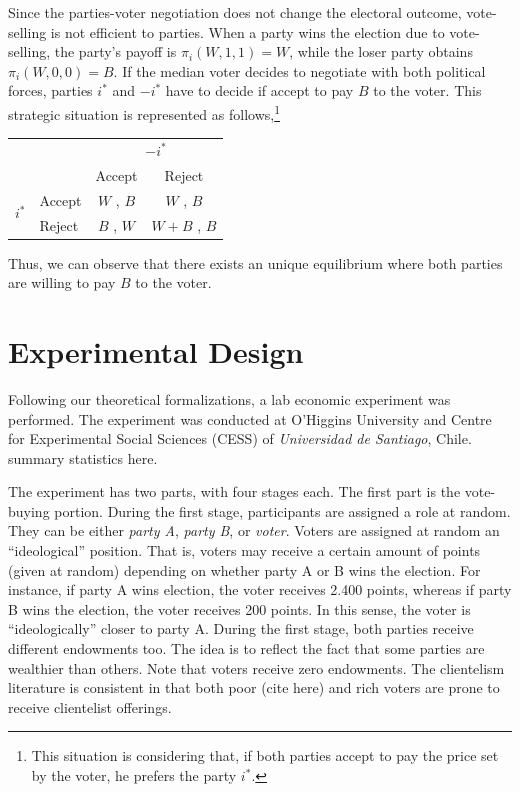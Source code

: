 \documentclass[onesided]{article}\usepackage[]{graphicx}\usepackage[]{color}
\begin{document}
Since the parties-voter negotiation does not change the electoral outcome, vote-selling is not efficient to parties. When a party wins the election due to vote-selling, the party's payoff is $\pi_i(W,1,1)=W$, while the loser party obtains $\pi_i(W,0,0)=B$. If the median voter decides to negotiate with both political forces, parties $i^*$ and $-i^*$ have to decide if accept to pay $B$ to the voter. This strategic situation is represented as follows,\footnote{This situation is considering that, if both parties accept to pay the price set by the voter, he prefers the party $i^*$.}


\begin{center}

\begin{tabular}{ll|c|c|}
     & \multicolumn{1}{c}{}& \multicolumn{2}{c}{\textbf{$-i^*$}}  \\
     &\multicolumn{1}{c}{} &\multicolumn{1}{c}{Accept} & \multicolumn{1}{c}{Reject} \\
     \cline{3-4}
    \multirow{ 2}{*}{$i^*$} & Accept & $W$ , $B$ & $W$ , $B$ \\
      \cline{3-4}
     & Reject & $B$ , $W$ & $W+B$ , $B$ \\
      \cline{3-4}
\end{tabular}
\end{center}

Thus, we can observe that there exists an unique equilibrium where both parties are willing to pay $B$ to the voter.


\section{Experimental Design}

Following our theoretical formalizations, a lab economic experiment was performed. The experiment was conducted at O'Higgins University and Centre for Experimental Social Sciences (CESS) of \emph{Universidad de Santiago}, Chile. {\color{red}summary statistics here}. 

The experiment has two parts, with four stages each. The first part is the vote-buying portion. During the first stage, participants are assigned a role at random. They can be either \emph{party A}, \emph{party B}, or \emph{voter}. Voters are assigned at random an ``ideological'' position. That is, voters may receive a certain amount of points (given at random) depending on whether party A or B wins the election. For instance, if party A wins election, the voter receives 2.400 points, whereas if party B wins the election, the voter receives 200 points. In this sense, the voter is ``ideologically'' closer to party A. During the first stage, both parties receive different endowments too. The idea is to reflect the fact that some parties are wealthier than others. Note that voters receive zero endowments. The clientelism literature is consistent in that both poor ({\color{red}cite here}) and rich voters are prone to receive clientelist offerings. 
\end{document}
